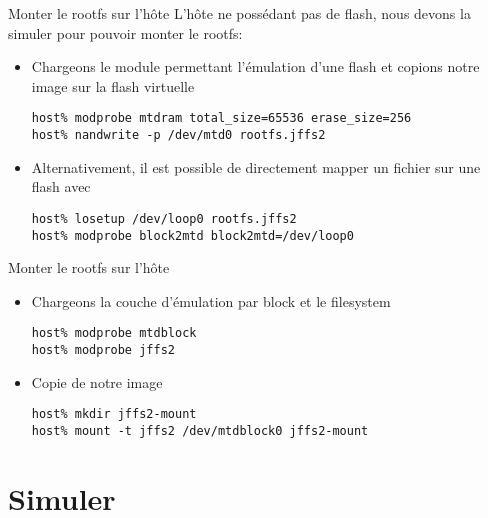 \begin{frame}[fragile=singleslide]{Monter le rootfs sur l'hôte}
  L'hôte  ne possédant  pas  de  flash, nous  devons  la simuler  pour
  pouvoir monter le rootfs:
  \begin{itemize} 
  \item  Chargeons le  module  permettant l'émulation  d'une flash  et
    copions notre image sur la flash virtuelle
    \begin{lstlisting}
host% modprobe mtdram total_size=65536 erase_size=256
host% nandwrite -p /dev/mtd0 rootfs.jffs2
    \end{lstlisting}
  \item  Alternativement, il  est  possible de  directement mapper  un
    fichier sur une flash avec 
    \begin{lstlisting}
host% losetup /dev/loop0 rootfs.jffs2
host% modprobe block2mtd block2mtd=/dev/loop0
    \end{lstlisting} 
  \end{itemize}
\end{frame}

\begin{frame}[fragile=singleslide]{Monter le rootfs sur l'hôte}
  \begin{itemize} 
  \item Chargeons la couche d'émulation par block et le filesystem
    \begin{lstlisting}
host% modprobe mtdblock
host% modprobe jffs2
    \end{lstlisting}
  \item Copie de notre image
    \begin{lstlisting} 
host% mkdir jffs2-mount
host% mount -t jffs2 /dev/mtdblock0 jffs2-mount
    \end{lstlisting} 
  \end{itemize}
\end{frame}


\section{Simuler}

